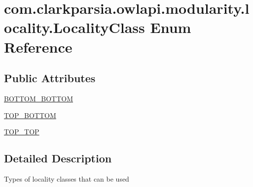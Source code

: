 \hypertarget{enumcom_1_1clarkparsia_1_1owlapi_1_1modularity_1_1locality_1_1_locality_class}{\section{com.\-clarkparsia.\-owlapi.\-modularity.\-locality.\-Locality\-Class Enum Reference}
\label{enumcom_1_1clarkparsia_1_1owlapi_1_1modularity_1_1locality_1_1_locality_class}
}
\subsection*{Public Attributes}
\begin{DoxyCompactItemize}
\item 
\hyperlink{enumcom_1_1clarkparsia_1_1owlapi_1_1modularity_1_1locality_1_1_locality_class_a92aad7642054d7749aba9d29a8b119f3}{B\-O\-T\-T\-O\-M\-\_\-\-B\-O\-T\-T\-O\-M}
\item 
\hyperlink{enumcom_1_1clarkparsia_1_1owlapi_1_1modularity_1_1locality_1_1_locality_class_ae309a0aa78d530c0a9955297864dceec}{T\-O\-P\-\_\-\-B\-O\-T\-T\-O\-M}
\item 
\hyperlink{enumcom_1_1clarkparsia_1_1owlapi_1_1modularity_1_1locality_1_1_locality_class_a5ec2368660cbebbd0dab9e6a4df1bcb7}{T\-O\-P\-\_\-\-T\-O\-P}
\end{DoxyCompactItemize}


\subsection{Detailed Description}
Types of locality classes that can be used 

